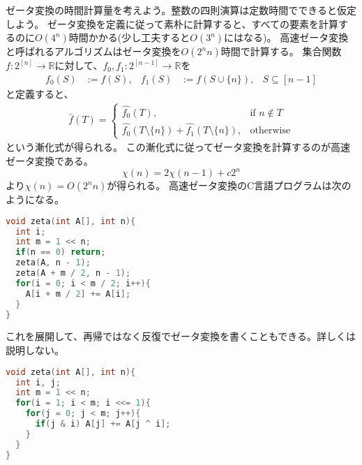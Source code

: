 \documentclass[a4paper,twoside,onecolumn,openany,article,10pt]{memoir}
\theoremstyle{definition}
\theoremstyle{remark}
\begin{document}
ゼータ変換の時間計算量を考えよう。整数の四則演算は定数時間でできると仮定しよう。
ゼータ変換を定義に従って素朴に計算すると、すべての要素を計算するのに$O(4^n)$時間かかる(少し工夫すると$O(3^n)$にはなる)。
高速ゼータ変換と呼ばれるアルゴリズムはゼータ変換を$O(2^n n)$時間で計算する。
集合関数$f\colon 2^{[n]}\to\mathbb{R}$に対して、$f_0, f_1\colon 2^{[n-1]}\to\mathbb{R}$を
\begin{align*}
f_0(S) &:= f(S), & f_1(S) &:= f(S\cup\{n\}),& S\subseteq[n-1]
\end{align*}
と定義すると、
\begin{align*}
\widehat{f}(T) =
\begin{cases}
\widehat{f_0}(T),&\text{if } n\notin T\\
\widehat{f_0}(T\setminus\{n\})+\widehat{f_1}(T\setminus\{n\}),&\text{otherwise}
\end{cases}
\end{align*}
という漸化式が得られる。
この漸化式に従ってゼータ変換を計算するのが高速ゼータ変換である。
\begin{equation*}
\chi(n) = 2\chi(n-1) + c2^n
\end{equation*}
より$\chi(n) = O(2^n n)$が得られる。
高速ゼータ変換のC言語プログラムは次のようになる。
\begin{lstlisting}[basicstyle=\ttfamily\normalsize,showstringspaces=false,language=C,frame=single]
void zeta(int A[], int n){
  int i;
  int m = 1 << n;
  if(n == 0) return;
  zeta(A, n - 1);
  zeta(A + m / 2, n - 1);
  for(i = 0; i < m / 2; i++){
    A[i + m / 2] += A[i];
  }
}
\end{lstlisting}
これを展開して、再帰ではなく反復でゼータ変換を書くこともできる。詳しくは説明しない。
\begin{lstlisting}[basicstyle=\ttfamily\normalsize,showstringspaces=false,language=C,frame=single]
void zeta(int A[], int n){
  int i, j;
  int m = 1 << n;
  for(i = 1; i < m; i <<= 1){
    for(j = 0; j < m; j++){
      if(j & i) A[j] += A[j ^ i];
    }
  }
}
\end{lstlisting}
\end{document}
